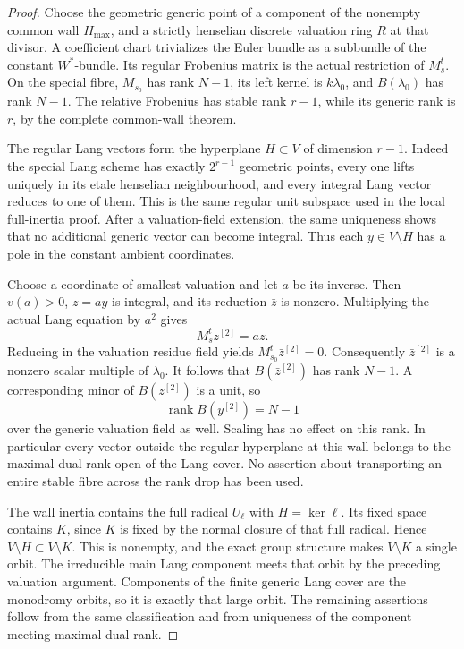 \begin{proof}
Choose the geometric generic point of a component of the nonempty
common wall \(H_{\max}\), and a strictly henselian discrete valuation
ring \(R\) at that divisor. A coefficient chart trivializes the Euler
bundle as a subbundle of the constant \(W^*\)-bundle. Its regular
Frobenius matrix is the actual restriction of \(M_s^t\).
On the special fibre, \(M_{s_0}\) has rank \(N-1\), its left kernel
is \(k\lambda_0\), and \(B(\lambda_0)\) has rank \(N-1\).
The relative Frobenius has stable rank \(r-1\), while its generic
rank is \(r\), by the complete common-wall theorem.

The regular Lang vectors form the hyperplane \(H\subset V\) of
dimension \(r-1\). Indeed the special Lang scheme has exactly
\(2^{r-1}\) geometric points, every one lifts uniquely in its etale
henselian neighbourhood, and every integral Lang vector reduces
to one of them. This is the same regular unit subspace used in the
local full-inertia proof. After a valuation-field extension, the
same uniqueness shows that no additional generic vector can become
integral. Thus each \(y\in V\setminus H\) has a pole in the constant
ambient coordinates.

Choose a coordinate of smallest valuation and let \(a\) be its
inverse. Then \(v(a)>0\), \(z=ay\) is integral, and its reduction
\(\bar z\) is nonzero. Multiplying the actual Lang equation by
\(a^2\) gives
\[
                       M_s^t z^{[2]}=a z.
\]
Reducing in the valuation residue field yields
\(M_{s_0}^t\bar z^{[2]}=0\). Consequently
\(\bar z^{[2]}\) is a nonzero scalar multiple of \(\lambda_0\).
It follows that \(B(\bar z^{[2]})\) has rank \(N-1\). A corresponding
minor of \(B(z^{[2]})\) is a unit, so
\[
                       \operatorname{rank}B(y^{[2]})=N-1
\]
over the generic valuation field as well. Scaling has no effect on
this rank. In particular every vector outside the regular hyperplane
at this wall belongs to the maximal-dual-rank open of the Lang cover.
No assertion about transporting an entire stable fibre across the
rank drop has been used.

The wall inertia contains the full radical \(U_\ell\) with
\(H=\ker\ell\). Its fixed space contains \(K\), since \(K\)
is fixed by the normal closure of that full radical. Hence
\(V\setminus H\subset V\setminus K\). This is nonempty, and the
exact group structure makes \(V\setminus K\) a single orbit.
The irreducible main Lang component meets that orbit by the preceding
valuation argument. Components of the finite generic Lang cover
are the monodromy orbits, so it is exactly that large orbit.
The remaining assertions follow from the same classification and
from uniqueness of the component meeting maximal dual rank.
\end{proof}

